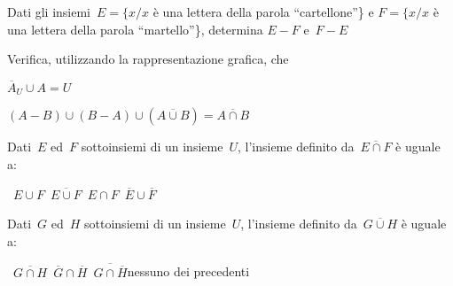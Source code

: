 
\begin{esercizio}
\label{ese:7.14}
Dati gli insiemi~\(E=\{x / x\) è una lettera della parola ``cartellone''\} e
\(F=\{x / x\) è una lettera della parola ``martello''\}, determina
\(E-F\) e~\(F-E\)
\end{esercizio}


\begin{esercizio}
\label{ese:7.15}
Verifica, utilizzando la rappresentazione grafica, che
 \begin{enumeratea}
 \item \(\overline{A}_{U}\cup A=U\)
 \item \((A-B)\cup (B-A)\cup (\overline{A\cup B})=\overline{{A\cap B}}\)
 \end{enumeratea}
\end{esercizio}

\begin{esercizio}
 \label{ese:7.16}
Dati~\(E\) ed~\(F\) sottoinsiemi di un insieme~\(U\), l'insieme
definito da~\(\overline{E\cap F}\) è uguale a:
\begin{center}
\boxA\quad~\(E\cup F\)\quad\boxB\quad~\(\overline{E\cup F}\)\quad\boxC\quad~\(E\cap 
F\)\quad\boxD\quad~\(\overline{E}\cup\overline{F}\)
\end{center}
\end{esercizio}

\begin{esercizio}
 \label{ese:7.17}
Dati~\(G\) ed~\(H\) sottoinsiemi di un insieme~\(U\), l'insieme
definito da~\(\overline{G\cup H}\) è uguale a:
\begin{center}
\boxA\quad~\(\overline{{G\cap 
H}}\)\quad\boxB\quad~\(\overline{G}\cap\overline{H}\)\quad\boxC\quad~\(\overline{{
G\cap \overline{H}}}\)\quad\boxD\quad nessuno dei precedenti
\end{center}
\end{esercizio}

